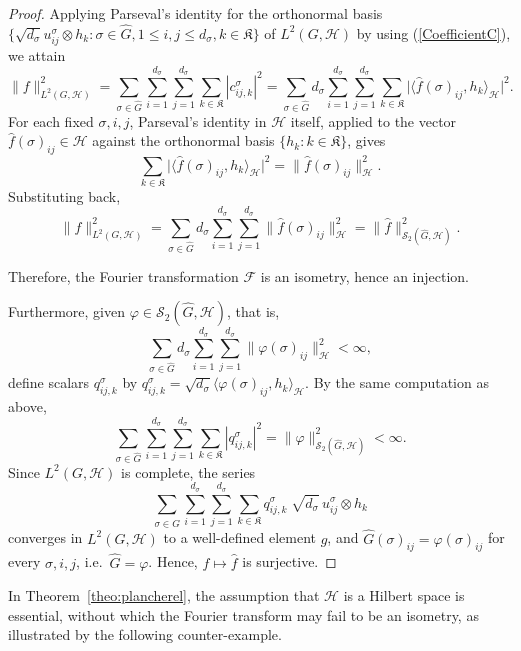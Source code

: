 \documentclass[11pt]{amsart}
\begin{document}
\begin{proof}
\noindent Applying Parseval's identity for
the orthonormal basis
 $\{\sqrt{d_\sigma}u^\sigma_{ij}\otimes h_k:\sigma\in \widehat{G}, 1\le i,j\le d_\sigma, k\in \mathfrak{K}\}$ of $L^2(G,\mathcal{H})$
by using (\ref{CoefficientC}), we attain
\[
\|f\|_{L^2(G,\mathcal{H})}^2=\sum_{\sigma\in \widehat{G}}\sum_{i=1}^{d_\sigma}\sum_{j=1}^{d_\sigma}\sum_{k\in \mathfrak{K}}|c^\sigma_{ij,k}|^2
=\sum_{\sigma\in \widehat{G}}d_\sigma\sum_{i=1}^{d_\sigma}\sum_{j=1}^{d_\sigma}\sum_{k\in \mathfrak{K}}\big|\langle\widehat f(\sigma)_{ij},h_k\rangle_\mathcal{H}\big|^2.
\]
For each fixed $\sigma,i,j$, Parseval's identity in $\mathcal{H}$ itself, applied to the vector
$\widehat f(\sigma)_{ij}\in\mathcal{H}$ against the orthonormal basis $\{h_k:k\in \mathfrak{K}\}$, gives
\[
\sum_{k\in \mathfrak{K}}\big|\langle \widehat f(\sigma)_{ij},h_k\rangle_\mathcal{H}\big|^2=\|\widehat f(\sigma)_{ij}\|_\mathcal{H}^2.
\]
Substituting back,
\[
\|f\|_{L^2(G,\mathcal{H})}^2=\sum_{\sigma\in \widehat{G}}d_\sigma\sum_{i=1}^{d_\sigma}\sum_{j=1}^{d_\sigma}\|\widehat f(\sigma)_{ij}\|_\mathcal{H}^2
=\|\widehat f\|_{\mathscr{S}_2(\widehat{G},\mathcal{H})}^2.
\]

Therefore, the Fourier transformation $\mathscr{F}$ is an isometry, hence  an  injection. 
\smallskip

Furthermore, given $\varphi\in \mathscr{S}_2(\widehat{G},\mathcal{H})$, that is,  $$\sum_{\sigma\in \widehat{G}}d_\sigma\sum_{i=1}^{d_\sigma}\sum_{j=1}^{d_\sigma}\|\varphi(\sigma)_{ij}\|_\mathcal{H}^2<\infty, $$
 define scalars $q^\sigma_{ij,k}$ by
$q^\sigma_{ij,k}=\sqrt{d_\sigma}\langle\varphi(\sigma)_{ij},h_k\rangle_\mathcal{H}$. By the same computation as above, $$\sum_{\sigma\in \widehat{G}}\sum_{i=1}^{d_\sigma}\sum_{j=1}^{d_\sigma}\sum_{k\in \mathfrak{K}}
|q^\sigma_{ij,k}|^2=\|\varphi\|_{\mathscr{S}_2(\widehat{G},\mathcal{H})}^2<\infty.$$
Since $L^2(G,\mathcal{H})$ is complete,  the series
\[
\sum_{\sigma\in \widehat{G}}\sum_{i=1}^{d_\sigma}\sum_{j=1}^{d_\sigma}\sum_{k\in \mathfrak{K}}q^\sigma_{ij,k}\;\sqrt{d_\sigma}\,u^\sigma_{ij}\otimes h_k
\]
converges in $L^2(G,\mathcal{H})$ to a well-defined element $g$, and  
 $\widehat{G}(\sigma)_{ij}=\varphi(\sigma)_{ij}$ for every $\sigma,i,j$,
i.e.\ $\widehat{G}=\varphi$. Hence, $f\mapsto\widehat f$ is surjective. 
\end{proof}
In Theorem~\ref{theo:plancherel}, the assumption that \(\mathcal{H}\) is a Hilbert space is essential, without which the Fourier transform may fail to be an isometry, as illustrated by the following counter-example.
\end{document}
